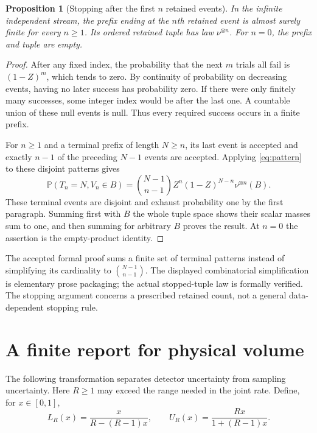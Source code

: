 \documentclass[11pt]{article}
\newtheorem{proposition}[theorem]{Proposition}
\theoremstyle{remark}
\newcommand{\Prb}{\mathbb P}
\begin{document}
\begin{proposition}[Stopping after the first $n$ retained events]
\label{prop:stopping}
In the infinite independent stream, the prefix ending at the $n$th retained
event is almost surely finite for every $n\ge1$. Its ordered retained
tuple has law $\nu^{\otimes n}$. For $n=0$, the prefix and tuple are empty.
\end{proposition}
\begin{proof}
After any fixed index, the probability that the next $m$ trials all fail is
$(1-Z)^m$, which tends to zero. By continuity of probability on decreasing
events, having no later success has probability zero. If there were only
finitely many successes, some integer index would be after the last one.
A countable union of these null events is null. Thus every required
success occurs in a finite prefix.

For $n\ge1$ and a terminal prefix of length $N\ge n$, its last event is
accepted and exactly $n-1$ of the preceding $N-1$ events are accepted.
Applying \eqref{eq:pattern} to these disjoint patterns gives
\[
 \Prb(T_n=N,V_n\in B)
 =\binom{N-1}{n-1}Z^n(1-Z)^{N-n}\nu^{\otimes n}(B).
\]
These terminal events are disjoint and exhaust probability one by the
first paragraph. Summing first with $B$ the whole tuple space shows their
scalar masses sum to one, and then summing for arbitrary $B$ proves the
result. At $n=0$ the assertion is the empty-product identity.
\end{proof}

The accepted formal proof sums a finite set of terminal patterns instead
of simplifying its cardinality to $\binom{N-1}{n-1}$. The displayed
combinatorial simplification is elementary prose packaging; the actual
stopped-tuple law is formally verified. The stopping argument concerns a
prescribed retained count, not a general data-dependent stopping rule.

\section{A finite report for physical volume}\label{sec:report}
The following transformation separates detector uncertainty from sampling
uncertainty. Here $R\ge1$ may exceed the range needed in the joint rate.
Define, for $x\in[0,1]$,
\begin{equation}\label{eq:transforms}
 L_R(x)=\frac{x}{R-(R-1)x},\qquad
 U_R(x)=\frac{Rx}{1+(R-1)x}.
\end{equation}
\end{document}
